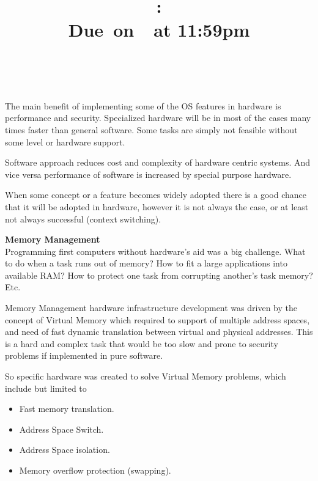 \documentclass{article}
\title{
    \vspace{2in}
    \textmd{\textbf{\hmwkClass: \hmwkTitle}}\\
    \normalsize\vspace{0.1in}\small{Due\ on\ \hmwkDueDate\ at 11:59pm}\\
    \vspace{0.1in}\large{\textit{\hmwkClassInstructor\ \hmwkClassTime}}
    \vspace{3in}
}
\author{\textbf{\hmwkAuthorName}}
\date{}
\begin{document}
\maketitle

\pagebreak


        \vspace{1cm}


        The main benefit of implementing some of the OS features in hardware is
        performance and security.
        Specialized hardware will be in most of the cases many times faster than general
        software. Some tasks are simply not feasible without some level or hardware
        support. 

        Software approach reduces cost and complexity of hardware centric systems. And
        vice versa performance of software is increased by special purpose hardware.

        When some concept or a feature becomes widely adopted there is a good chance that it
        will be adopted in hardware, however it is not always the case, or at least not
        always successful (context switching).


        \textbf{Memory Management}\\

        Programming first computers without hardware's aid was a big challenge.
        What to do when a task runs out of memory? How to fit a large applications into
        available RAM? How to protect one task from corrupting another's task memory? Etc.

        Memory Management hardware infrastructure development was driven by the 
        concept of Virtual Memory which required to support of multiple address spaces, and 
        need of fast dynamic translation between virtual and physical addresses. 
        This is a hard and complex task that would be too slow and prone to security problems
        if implemented in pure software. 

        So specific hardware was created to solve Virtual Memory problems, which include but
        limited to
        \begin{itemize}
            \item Fast memory translation.
            \item Address Space Switch.
            \item Address Space isolation.
            \item Memory overflow protection (swapping).
        \end{itemize}
\end{document}
